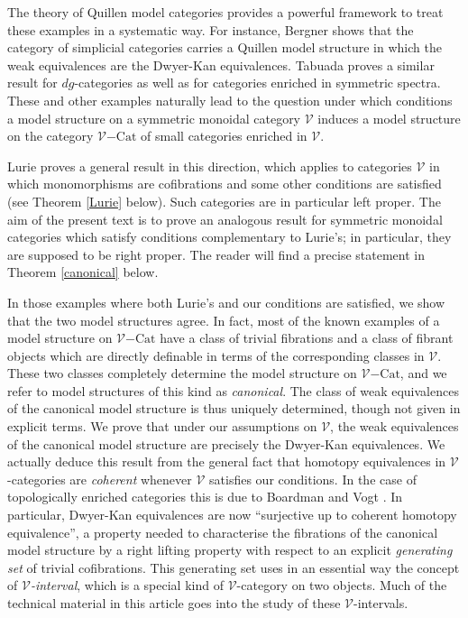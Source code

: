 \documentclass[10pt]{amsart}
\theoremstyle{plain}
\theoremstyle{remark}
\def\Vv{\mathcal{V}}
\def\Cat{\mathrm{Cat}}
\def\VCat{\Vv\mathrm{-}\Cat}
\begin{document}
The theory of Quillen model categories \cite{Hi,Ho} provides a powerful framework to treat these examples in a systematic way. For instance, Bergner \cite{Be1} shows that the category of simplicial categories carries a Quillen model structure in which the weak equivalences are the Dwyer-Kan equivalences. Tabuada \cite{Ta,Ta2} proves a similar result for $dg$-categories as well as for categories enriched in symmetric spectra. These and other examples naturally lead to the question under which conditions a model structure on a symmetric monoidal category $\Vv$ induces a model structure on the category $\VCat$ of small categories enriched in $\Vv$.

Lurie \cite{Lu} proves a general result in this direction, which applies to categories $\Vv$ in which monomorphisms are cofibrations and some other conditions are satisfied (see Theorem \ref{Lurie} below). Such categories are in particular left proper. The aim of the present text is to prove an analogous result for symmetric monoidal categories which satisfy conditions complementary to Lurie's; in particular, they are supposed to be right proper. The reader will find a precise statement in Theorem \ref{canonical} below.

In those examples where both Lurie's and our conditions are satisfied, we show that the two model structures agree. In fact, most of the known examples of a model structure on $\VCat$ have a class of trivial fibrations and a class of fibrant objects which are directly definable in terms of the corresponding classes in $\Vv$. These two classes completely determine the model structure on $\VCat$, and we refer to model structures of this kind as \emph{canonical}.  The class of weak equivalences of the canonical model structure is thus uniquely determined, though not given in explicit terms. We prove that under our assumptions on $\Vv$, the weak equivalences of the canonical model structure are precisely the Dwyer-Kan equivalences. We actually deduce this result from the general fact that homotopy equivalences in $\Vv$-categories are \emph{coherent} whenever $\Vv$ satisfies our conditions. In the case of topologically enriched categories this is due to Boardman and Vogt \cite[Lemma 4.16]{BV}. In particular, Dwyer-Kan equivalences are now ``surjective up to coherent homotopy equivalence'', a property needed to characterise the fibrations of the canonical model structure by a right lifting property with respect to an explicit \emph{generating set} of trivial cofibrations. This generating set uses in an essential way the concept of \emph{$\Vv$-interval}, which is a special kind of $\Vv$-category on two objects. Much of the technical material in this article goes into the study of these $\Vv$-intervals.
\end{document}
